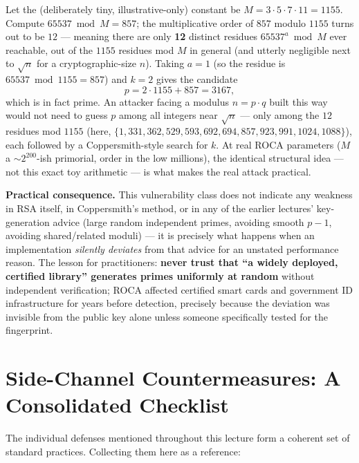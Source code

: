 \begin{example}
Let the (deliberately tiny, illustrative-only) constant be $M = 3 \cdot 5 \cdot 7 \cdot 11 = 1155$. Compute $65537 \bmod M = 857$; the multiplicative order of $857$ modulo $1155$ turns out to be $12$ — meaning there are only \textbf{12} distinct residues $65537^a \bmod M$ ever reachable, out of the $1155$ residues mod $M$ in general (and utterly negligible next to $\sqrt n$ for a cryptographic-size $n$). Taking $a=1$ (so the residue is $65537 \bmod 1155 = 857$) and $k=2$ gives the candidate
\[
p = 2 \cdot 1155 + 857 = 3167,
\]
which is in fact prime. An attacker facing a modulus $n = p \cdot q$ built this way would not need to guess $p$ among all integers near $\sqrt n$ — only among the $12$ residues mod $1155$ (here, $\{1, 331, 362, 529, 593, 692, 694, 857, 923, 991, 1024, 1088\}$), each followed by a Coppersmith-style search for $k$. At real ROCA parameters ($M$ a $\sim$$2^{200}$-ish primorial, order in the low millions), the identical structural idea — not this exact toy arithmetic — is what makes the real attack practical.
\end{example}

\medskip\noindent\textbf{Practical consequence.} This vulnerability class does not indicate any weakness in RSA itself, in Coppersmith's method, or in any of the earlier lectures' key-generation advice (large random independent primes, avoiding smooth $p-1$, avoiding shared/related moduli) — it is precisely what happens when an implementation \emph{silently deviates} from that advice for an unstated performance reason. The lesson for practitioners: \textbf{never trust that ``a widely deployed, certified library'' generates primes uniformly at random} without independent verification; ROCA affected certified smart cards and government ID infrastructure for years before detection, precisely because the deviation was invisible from the public key alone unless someone specifically tested for the fingerprint.

\newpage
\section{Side-Channel Countermeasures: A Consolidated Checklist}

The individual defenses mentioned throughout this lecture form a coherent set of standard practices. Collecting them here as a reference:

